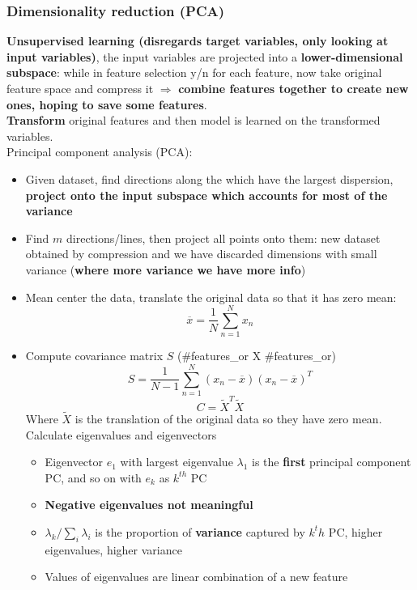 \subsubsection{Dimensionality reduction (PCA)}
    \textbf{Unsupervised learning (disregards target variables, only looking at input variables)}, the input variables are projected into a \textbf{lower-dimensional subspace}: while in feature selection y/n for each feature, now take original feature space and compress it $\Rightarrow$ \textbf{combine features together to create new ones, hoping to save some features}.\\
    \textbf{Transform} original features and then model is learned on the transformed variables.\\
    Principal component analysis (PCA):
    \begin{itemize}
        \item Given dataset, find directions along the which have the largest dispersion, \textbf{project onto the input subspace which accounts for most of the variance}
        \item Find $m$ directions/lines, then project all points onto them: new dataset obtained by compression and we have discarded dimensions with small variance (\textbf{where more variance we have more info})
        \item Mean center the data, translate the original data so that it has zero mean:
        $$\overline{x}=\frac{1}{N}\sum_{n=1}^Nx_n$$
        \item Compute covariance matrix $S$ (\#features\_or X \#features\_or)
        $$S=\frac{1}{N-1}\sum_{n=1}^N(x_n-\overline{x})(x_n-\overline{x})^T$$
        $$C=\tilde{X}^T\tilde{X}$$
        Where $\tilde{X}$ is the translation of the original data so they have zero mean.\\
        Calculate eigenvalues and eigenvectors
        \begin{itemize}
            \item Eigenvector $e_1$ with largest eigenvalue $\lambda_1$ is the \textbf{first} principal component PC, and so on with $e_k$ as $k^{th}$ PC
            \item \textbf{Negative eigenvalues not meaningful}
            \item $\lambda_k/\sum_i\lambda_i$ is the proportion of \textbf{variance} captured by $k^th$ PC, higher eigenvalues, higher variance
            \item Values of eigenvalues are linear combination of a new feature
        \end{itemize}

\end{itemize}
